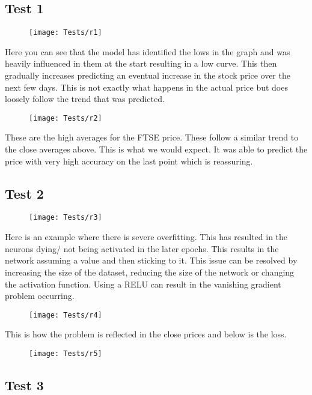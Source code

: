 \documentclass{article}
\begin{document}
\subsection{Test 1}
\begin{figure}[H]
    \centering
    \texttt{[image: Tests/r1]}
    \caption{}
\end{figure}
Here you can see that the model has identified the lows in the graph and was
heavily influenced in them at the start resulting in a low curve. This then
gradually increases predicting an eventual increase in the stock price over the
next few days. This is not exactly what happens in the actual price but does
loosely follow the trend that was predicted.
\begin{figure}[H]
    \centering
    \texttt{[image: Tests/r2]}
    \caption{}
\end{figure}
These are the high averages for the FTSE price. These follow a similar trend
to the close averages above. This is what we would expect. It was able to predict
the price with very high accuracy on the last point which is reassuring.

\subsection{Test 2}
\begin{figure}[H]
    \centering
    \texttt{[image: Tests/r3]}
    \caption{}
\end{figure}
Here is an example where there is severe overfitting. This has resulted in the
neurons dying/ not being activated in the later epochs. This results in the
network assuming a value and then sticking to it. This issue can be resolved by
increasing the size of the dataset, reducing the size of the network or changing
the activation function. Using a RELU can result in the vanishing gradient
problem occurring.
\begin{figure}[H]
    \centering
    \texttt{[image: Tests/r4]}
    \caption{}
\end{figure}
This is how the problem is reflected in the close prices and below is the loss.
\begin{figure}[H]
    \centering
    \texttt{[image: Tests/r5]}
    \caption{}
\end{figure}
\subsection{Test 3}
\end{document}

